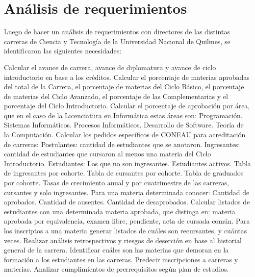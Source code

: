 \section[Análisis de requerimientos]{Análisis de requerimientos}

Luego de hacer un análisis de requerimientos con directores de las distintas carreras de Ciencia y Tecnología de la Universidad Nacional de Quilmes, se identificaron las siguientes necesidades:

\begin{outline}
    \1 Calcular el avance de carrera, avance de diplomatura y avance de ciclo introductorio en base a los créditos.
    \1 Calcular el porcentaje de materias aprobadas del total de la Carrera, el porcentaje de materias del Ciclo Básico, el porcentaje de materias del Ciclo Avanzado, el porcentaje de las Complementarias y el porcentaje del Ciclo Introductorio.
    \1 Calcular el porcentaje de aprobación por área, que en el caso de la Licenciatura en Informática estas áreas son: 
        \2 Programación.
        \2 Sistemas Informáticos.
        \2 Procesos Informáticos.
        \2 Desarrollo de Software.
        \2 Teoría de la Computación.
    \1 Calcular los pedidos específicos de CONEAU para acreditación de carreras:
        \2 Postulantes: cantidad de estudiantes que se anotaron.
        \2 Ingresantes: cantidad de estudiantes que cursaron al menos una materia del Ciclo Introductorio.
        \2 Estudiantes: Los que no son ingresantes. Estudiantes activos.
        \2 Tabla de ingresantes por cohorte.
        \2 Tabla de cursantes por cohorte.
        \2 Tabla de graduados por cohorte.
        \2 Tasas de crecimiento anual y por cuatrimestre de las carreras, cursantes y solo ingresantes.
    \1 Para una materia determinada conocer:
        \2 Cantidad de aprobados.
        \2 Cantidad de ausentes.
        \2 Cantidad de desaprobados.
    \1 Calcular listados de estudiantes con una determinada materia aprobada, que distinga en: materia aprobada por equivalencia, examen libre, pendiente, acta de cursada común.
    \1 Para los inscriptos a una materia generar listados de cuáles son recursantes, y cuántas veces.
    \1 Realizar análisis retrospectivos y riesgos de deserción en base al historial general de la carrera.
    \1 Identificar cuáles son las materias que demoran en la formación a los estudiantes en las carreras. 
    \1 Predecir inscripciones a carreras y materias.
    \1 Analizar cumplimientos de prerrequisitos según plan de estudios.
        
\end{outline}


